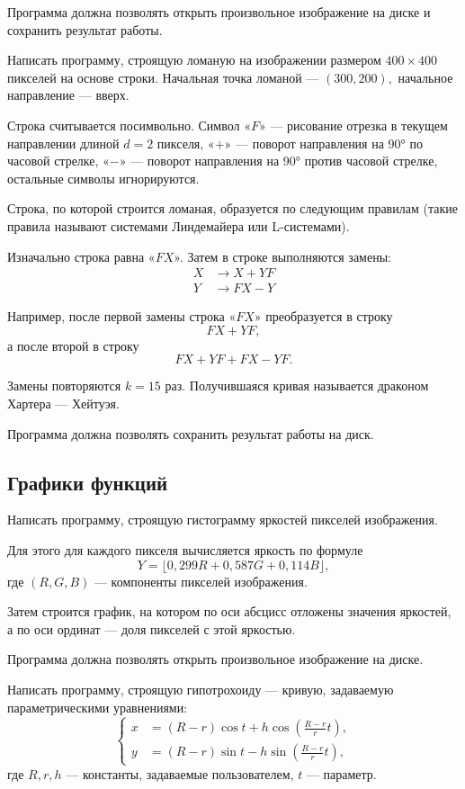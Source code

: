 Программа должна позволять открыть произвольное изображение на диске и
сохранить результат работы.

\task Написать программу, строящую ломаную на изображении размером
$400 \times 400$ пикселей на основе строки. Начальная точка ломаной —
$(300, 200),$ начальное направление — вверх.

Строка считывается посимвольно. Символ «$F$» — рисование отрезка в
текущем направлении длиной $d=2$ пикселя, «$+$» — поворот направления на
90° по часовой стрелке, «$-$» — поворот направления на 90° против
часовой стрелке, остальные символы игнорируются.

Строка, по которой строится ломаная, образуется по следующим правилам
(такие правила называют системами Линдемайера или L-системами).

Изначально строка равна «$FX$». Затем в строке выполняются замены:
\[
\begin{aligned}
  X &\to X+YF\\
  Y &\to FX-Y
\end{aligned}
\]

Например, после первой замены строка «$FX$» преобразуется в строку
\[
FX+YF,
\]
а после второй в строку
\[
FX+YF+FX-YF.
\]

Замены повторяются $k = 15$ раз. Получившаяся кривая называется
драконом Хартера — Хейтуэя.

Программа должна позволять сохранить результат работы на диск.


\subsection{Графики функций}

\task Написать программу, строящую гистограмму яркостей пикселей
изображения.

Для этого для каждого пикселя вычисляется яркость по формуле
\[
Y = \lfloor 0{,}299 R + 0{,}587 G + 0{,}114 B \rfloor,
\]
где $(R,G,B)$ — компоненты пикселей изображения.

Затем строится график, на котором по оси абсцисс отложены значения
яркостей, а по оси ординат — доля пикселей с этой яркостью.

Программа должна позволять открыть произвольное изображение на диске.

\task Написать программу, строящую гипотрохоиду — кривую, задаваемую
параметрическими уравнениями:
\[
\left\{
  \begin{aligned}
    x &= \left( R - r \right) \cos t + h \cos \left( \frac{R-r}r t \right),\\
    y &= \left( R - r \right) \sin t - h \sin \left( \frac{R-r}r t \right),
  \end{aligned}
\right.
\]
где $R, r, h$ — константы, задаваемые пользователем, $t$ — параметр.

